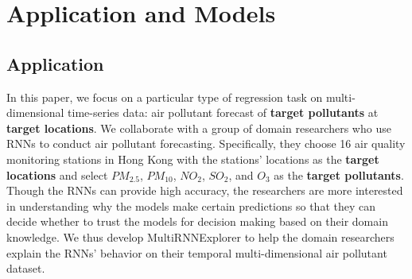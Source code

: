 \section{Application and Models}
\subsection{Application}
\label{section:application}
In this paper, we focus on a particular type of regression task on multi-dimensional time-series data: air pollutant forecast of \textbf{target pollutants} at \textbf{target locations}.
We collaborate with a group of domain researchers who use RNNs to conduct air pollutant forecasting.
Specifically, they choose 16 air quality monitoring stations in Hong Kong with the stations' locations as the \textbf{target locations} and select $PM_{2.5}$, $PM_{10}$, $NO_{2}$, $SO_{2}$, and $O_3$ as the \textbf{target pollutants}.
Though the RNNs can provide high accuracy, the researchers are more interested in understanding why the models make certain predictions so that they can decide whether to trust the models for decision making based on their domain knowledge.
We thus develop MultiRNNExplorer to help the domain researchers explain the RNNs' behavior on their temporal multi-dimensional air pollutant dataset.







